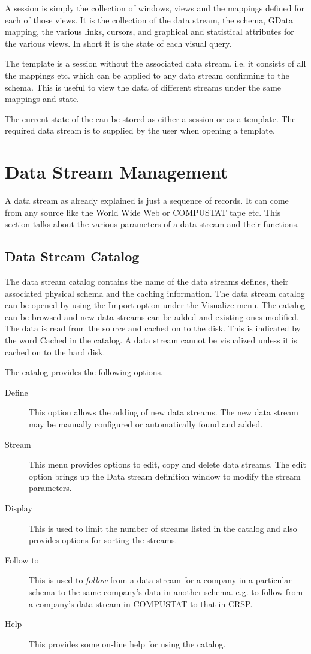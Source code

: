 A session is simply the collection of windows, views and the mappings
defined for each of those views. It is the collection of the data
stream, the schema, GData mapping, the various links, cursors, and
graphical and statistical attributes for the various views. In short
it is the state of each visual query.

The template is a session without the associated data stream. i.e. it
consists of all the mappings etc. which can be applied to any data
stream confirming to the schema. This is useful to view the data of
different streams under the same mappings and state.

The current state of the \Devise can be stored as either a session or
as a template. The required data stream is to supplied by the user
when opening a template.

\section{Data Stream Management}

A data stream as already explained is just a sequence of records. It
can come from any source like the World Wide Web or COMPUSTAT tape
etc. This section talks about the various parameters of a data stream
and their functions.

\subsection{Data Stream Catalog}

The data stream catalog contains the name of the data streams defines,
their associated physical schema and the caching information. The data
stream catalog can be opened by using the Import option under the
Visualize menu. The catalog can be browsed and new data streams can be
added and existing ones modified. The data is read from the source and
cached on to the disk. This is indicated by the word Cached in the
catalog. A data stream cannot be visualized unless it is cached on to
the hard disk.

The catalog provides the following options.
\begin{description}
\item[Define] This option allows the adding of new data streams. The
new data stream may be manually configured or automatically found and
added.
\item[Stream] This menu provides options to edit, copy and delete data
streams. The edit option brings up the Data stream definition window
to modify the stream parameters.
\item[Display] This is used to limit the number of streams listed in
the catalog and also provides options for sorting the streams.
\item[Follow to] This is used to {\em follow} from a data stream for
a company in a particular schema to the same company's data in another
schema. e.g. to follow from a company's data stream in COMPUSTAT to
that in CRSP.
\item[Help] This provides some on-line help for using the catalog.
\end{description}


